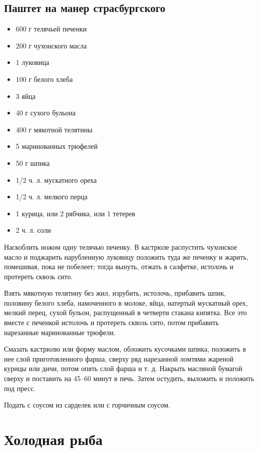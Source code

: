\subsection{Паштет на манер страсбургского}

\begin{itemize}
	\item 600 г телячьей печенки 
    \item 200 г чухонского масла
    \item 1 луковица 
    \item 100 г белого хлеба 
    \item 3 яйца 
    \item 40 г сухого бульона 
    \item 400 г мякотной телятины
    \item 5 маринованных трюфелей
    \item 50 г шпика 
    \item 1/2 ч. л. мускатного ореха
    \item 1/2 ч. л. мелкого перца 
    \item 1 курица, или 2 рябчика, или 1 тетерев 
    \item 2 ч. л. соли
\end{itemize}

Наскоблить ножом одну телячью печенку. В кастрюле распустить чухонское масло и поджарить нарубленную луковицу положить туда же печенку и жарить, помешивая, пока не побелеет; тогда вынуть, отжать в салфетке, истолочь и протереть сквозь сито.

Взять мякотную телятину без жил, изрубить, истолочь, прибавить шпик, половину белого хлеба, намоченного в молоке, яйца, натертый мускатный орех, мелкий перец, сухой бульон, распущенный в четверти стакана кипятка. Все это вместе с печенкой истолочь и протереть сквозь сито, потом прибавить нарезанные маринованные трюфели.

Смазать кастрюлю или форму маслом, обложить кусочками шпика, положить в нее слой приготовленного фарша, сверху ряд нарезанной ломтями жареной курицы или дичи, потом опять слой фарша и т. д. Накрыть масляной бумагой сверху и поставить на 45–60 минут в печь. Затем остудить, выложить и положить под пресс.

Подать с соусом из сарделек или с горчичным соусом.

\newpage
\section{Холодная рыба}

